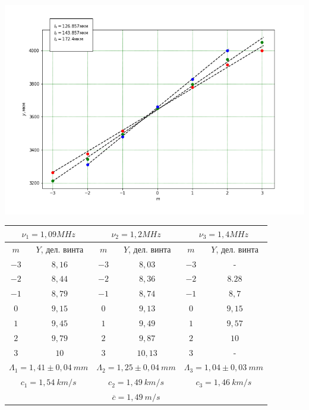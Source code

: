 \documentclass[12pt]{article}
\begin{document}
	\begin{center}
		
		\includegraphics[scale=.6]{speed_by_difr}
	\begin{tabular}{|c|c||c|c||c|c|}
		\hline 
		\multicolumn{2}{|c||}{$\nu_1 = 1,09 MHz$} &  	\multicolumn{2}{|c||}{$\nu_2= 1,2 MHz$}  & 	\multicolumn{2}{|c|}{$\nu_3 = 1,4 MHz$} \\ 
		\hline 
		\hline
		$m$ & $Y$, дел. винта  & $m$ & $Y$, дел. винта  & $m$ & $Y$, дел. винта  \\
		\hline
		$-3$& $8,16$ & $-3$ & $8,03$  & $-3$ & - \\ 
		\hline 
		$-2$& $8,44$ & $-2$ & $8,36$ & $-2$ & $8.28$ \\ 
		\hline 
		$-1$ & $8,79$ & $-1$ & $8,74$ & $-1$ & $8,7$  \\ 
		\hline 
		$0$& $9,15$ & $0$ & $9,13$ & $0$ & $9,15$ \\ 
		\hline 
		$1$& $9,45$ & $1$ & $9,49$ & $1$ & $9,57$  \\ 
		\hline 
		$2$& $9,79$ & $2$ & $9,87$ & $2$ & $10$ \\ 
		\hline 
		$3$& $10$ & $3$ & $10,13$ & $3$ & -  \\ 
		\hline 
		\hline
		\multicolumn{2}{|c||}{$\Lambda_1 = 1,41 \pm 0,04\ mm$} &  \multicolumn{2}{|c||}{$\Lambda_2 = 1,25 \pm 0,04\ mm$}  &  \multicolumn{2}{|c|}{$\Lambda_3 = 1,04 \pm 0,03\ mm$}\\ 
		\hline 
		\multicolumn{2}{|c||}{$c_1 = 1,54\ km/s$} &  \multicolumn{2}{|c||}{$c_2 = 1,49\ km/s$}  &  \multicolumn{2}{|c||}{$c_3 = 1,46\ km/s$} \\ 
		\hline
		\hline
		\multicolumn{6}{|c|}{$\overline{c} = 1,49\ m/s$}\\
		\hline 
	\end{tabular} 
	\end{center}
\end{document}
